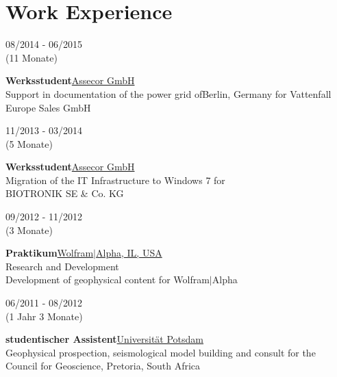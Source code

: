 \documentclass{article}
\begin{document}
\begin{minipage}[t]{0.65\textwidth}
		\section*{\fontsize{18pt}{24pt}\selectfont \color{pblue} Work Experience}		
		\begin{minipage}[t]{0.3\textwidth}
		08/2014 - 06/2015\\ (11 Monate)
		\end{minipage}
		\hfill
		\begin{minipage}[t]{0.7\textwidth}
		\textbf{Werksstudent}\hfill \href{https://assecor.de/}{\color{pblue}Assecor GmbH}\\
	    Support in documentation of the power grid ofBerlin, Germany for Vattenfall Europe Sales GmbH
		\end{minipage}\vspace{0.5cm}
		
		\begin{minipage}[t]{0.3\textwidth}
		11/2013 - 03/2014 \\ (5 Monate)
		\end{minipage}
		\hfill
		\begin{minipage}[t]{0.7\textwidth}
		\textbf{Werksstudent}\hfill \href{https://assecor.de/}{\color{pblue}Assecor GmbH}\\
	    Migration of the IT Infrastructure to Windows 7 for\\ BIOTRONIK SE \& Co. KG
		\end{minipage}\vspace{0.5cm}

		\begin{minipage}[t]{0.3\textwidth}
		09/2012 - 11/2012 \\ (3 Monate)
		\end{minipage}		
		\hfill
		\begin{minipage}[t]{0.7\textwidth}
		\textbf{Praktikum}\hfill \href{https:///www.wolframalpha.com/}{\color{pblue}Wolfram$\mid$Alpha, IL, USA}\\
	    Research and Development\\
	    Development of geophysical content for Wolfram$\mid$Alpha
		\end{minipage}\vspace{0.5cm}
		
		\begin{minipage}[t]{0.3\textwidth}
		06/2011 - 08/2012 \\ (1 Jahr 3 Monate)
		\end{minipage}
		\hfill
		\begin{minipage}[t]{0.7\textwidth}
		\textbf{studentischer Assistent}\hfill \href{https://www.uni-potsdam.de/}{\color{pblue}Universität Potsdam}\\
	    Geophysical prospection, seismological model building and consult for the Council for Geoscience, Pretoria, South Africa
		\end{minipage}\vspace{0.5cm}
		

\end{minipage}
\end{document}
